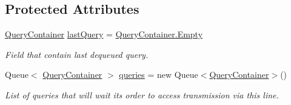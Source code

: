 \subsection*{Protected Attributes}
\begin{DoxyCompactItemize}
\item 
\mbox{\hyperlink{struct_pipes_provider_1_1_query_container}{Query\+Container}} \mbox{\hyperlink{class_pipes_provider_1_1_transmission_line_affdde0eafb483f2bf6f874679b4ab6f8}{last\+Query}} = \mbox{\hyperlink{struct_pipes_provider_1_1_query_container_a3daff9827ee4f77286eb4385a64e2fe2}{Query\+Container.\+Empty}}
\begin{DoxyCompactList}\small\item\em Field that contain last dequeued query. \end{DoxyCompactList}\item 
Queue$<$ \mbox{\hyperlink{struct_pipes_provider_1_1_query_container}{Query\+Container}} $>$ \mbox{\hyperlink{class_pipes_provider_1_1_transmission_line_ad866033fcbb1d9f783df8ff71e7fc21a}{queries}} = new Queue$<$\mbox{\hyperlink{struct_pipes_provider_1_1_query_container}{Query\+Container}}$>$()
\begin{DoxyCompactList}\small\item\em List of queries that will wait its order to access transmission via this line. \end{DoxyCompactList}\end{DoxyCompactItemize}

